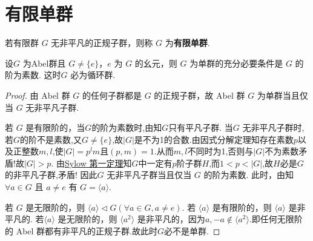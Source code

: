 \documentclass[../../main.tex]{subfiles}%
\begin{document}
\section{有限单群}

\begin{definition}[有限单群]
若有限群 \( G \) 无非平凡的正规子群，则称 \( G \) 为\textbf{有限单群}.
\end{definition}

\begin{theorem}\label{theorem:抽象代数--定理4.4.1}
设\( G \) 为Abel群且 \( G \neq \{e\} \)，\( e \) 为 \( G \) 的幺元，则 \( G \) 为单群的充分必要条件是 \( G \) 的阶为素数. 这时\( G \) 必为循环群.
\end{theorem}
\begin{proof}

由 Abel 群 \( G \) 的任何子群都是 \( G \) 的正规子群，故 Abel 群 \( G \) 为单群当且仅当 \( G \) 无非平凡子群. 

若 \( G \) 是有限阶的，当$G$的阶为素数时,由知$G$只有平凡子群.
当\( G \) 无非平凡子群时,若$G$的阶不是素数,又$G\neq \{e\}$,故$|G|$是不为1的合数.由因式分解定理知存在素数$p$以及正整数$m,l$,使$|G|=p^lm$且$(p,m)=1.$从而$m,l$不同时为1,否则与$|G|$不为素数矛盾!故$|G|>p$.
由\hyperref[theorem:Sylow 第一定理]{Sylow 第一定理}知$G$中一定有$p$阶子群$H$,而$1<p<|G|$,故$H$必是$G$的非平凡子群,矛盾!
因此\( G \) 无非平凡子群当且仅当 \( G \) 的阶为素数. 此时，由知\( \forall a \in G \) 且 \( a \neq e \) 有 \( G = \langle a \rangle \). 

若 \( G \) 是无限阶的，则 \( \langle a \rangle \lhd G (\forall a \in G, a \neq e) \). 若 \( \langle a \rangle \) 是有限阶的，则 \( \langle a \rangle \) 是非平凡的. 若\( \langle a \rangle \) 是无限阶的，则 \( \langle a^2 \rangle \) 是非平凡的，因为$a,-a\notin \langle a^2 \rangle$.即任何无限阶的 Abel 群都有非平凡的正规子群.故此时$G$必不是单群.

\end{proof}
\end{document}
